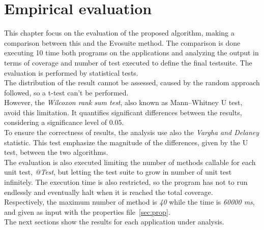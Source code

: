 \chapter{Empirical evaluation} \label{ch:EmpEvaluation}
This chapter focus on the evaluation of the proposed algorithm, making a comparison between this and the Evosuite method.
The comparison is done executing 10 time both programs on the applications and analyzing the output in terms of coverage and number of test executed to define the final testsuite.
The evaluation is performed by statistical tests.\\
The distribution of the result cannot be assessed, caused by the random approach followed, so a t-test can't be performed.\\
However, the \emph{Wilcoxon rank sum test}, also known as Mann–Whitney U test, avoid this limitation.
It quantifies significant differences between the results, considering a significance level of $0.05$.\\
To ensure the correctness of results, the analysis use also the \emph{Vargha and Delaney} statistic.
This test emphasize the magnitude of the differences, given by the U test, between the two algorithms.\\
The evaluation is also executed limiting the number of methods callable for each unit test, \emph{@Test}, but letting the test suite to grow in number of unit test infinitely.
The execution time is also restricted, so the program has not to run endlessly and eventually halt when it is reached the total coverage.\\
Respectively, the maximum number of method is \emph{40} while the time is \emph{60000 ms}, and given as input with the properties file~\ref{sec:prop}.\\
The next sections show the results for each application under analysis.





\newpage